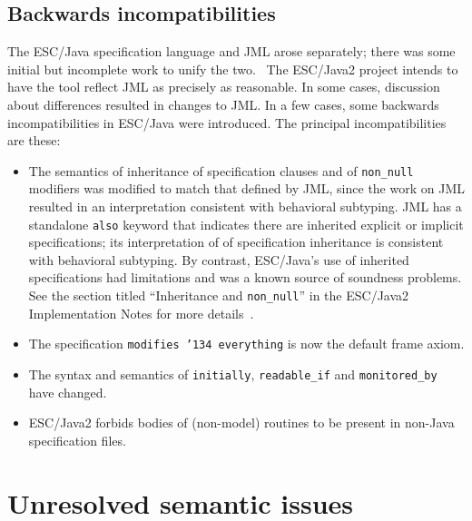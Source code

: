 \documentclass{llncs}
\begin{document}
\subsection{Backwards incompatibilities}
The ESC/Java specification language and JML arose separately; there
was some initial but incomplete work to unify the
two.~\cite{Leavens-etal03}  The ESC/Java2 project intends to have the
tool reflect JML as precisely as reasonable.  In some cases,
discussion about differences resulted in changes to JML.  In a few
cases, some backwards incompatibilities in ESC/Java were introduced.
The principal incompatibilities are these:
\setlength{\partopsep}{0in}\setlength{\parskip}{0in}\setlength{\itemsep}{0in}\setlength{\topsep}{0in}
\begin{itemize}
\setlength{\partopsep}{0in}\setlength{\parskip}{0in}\setlength{\itemsep}{0in}\setlength{\topsep}{0in}
\item The semantics of inheritance of specification clauses and of
  \texttt{non\_null} modifiers was modified to match that defined by
  JML, since the work on JML resulted in an interpretation consistent
  with behavioral subtyping.  JML has a standalone \texttt{also} keyword
that indicates there are inherited explicit or implicit specifications; its
interpretation of of specification inheritance is consistent with behavioral
subtyping.  By contrast, ESC/Java's use of inherited specifications had
limitations and was a known source of soundness problems. \cite{Leino-Nelson-Saxe00}
See
  the section titled ``Inheritance and \texttt{non\_null}'' in the
  ESC/Java2 Implementation Notes for more
  details~\cite{Cok04-Impl-Notes}.
\item The specification \texttt{modifies \char'134 everything} is now
  the default frame axiom.
\item The syntax and semantics of \texttt{initially},
  \texttt{readable\_if} and \texttt{monitored\_by} have changed.
\item ESC/Java2 forbids bodies of (non-model) routines to be present
  in non-Java specification files.
\end{itemize}

\section{Unresolved semantic issues}
\end{document}
